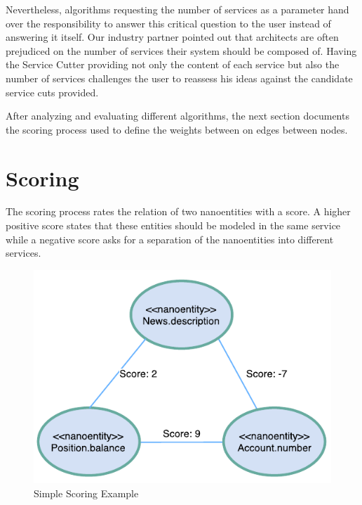 Nevertheless, algorithms requesting the number of services as a parameter hand over the responsibility to answer this critical question to the user instead of answering it itself. Our industry partner pointed out that architects are often prejudiced on the number of services their system should be composed of. Having the Service Cutter providing not only the content of each service but also the number of services challenges the user to reassess his ideas against the candidate service cuts provided. 

After analyzing and evaluating  different algorithms, the next section documents the scoring process used to define the weights between on edges between nodes.

\section{Scoring}
\label{sec:scores}

The scoring process rates the relation of two nanoentities with a score. A higher positive score states that these entities should be modeled in the same service while a negative score asks for a separation of the nanoentities into different services.

\begin{figure}[H]
	\begin{center}
		\includegraphics[scale=1]{diagrams/scoring_example.pdf}
		\caption{Simple Scoring Example}
		\label{fig:scoringExample}
	\end{center}
\end{figure}

